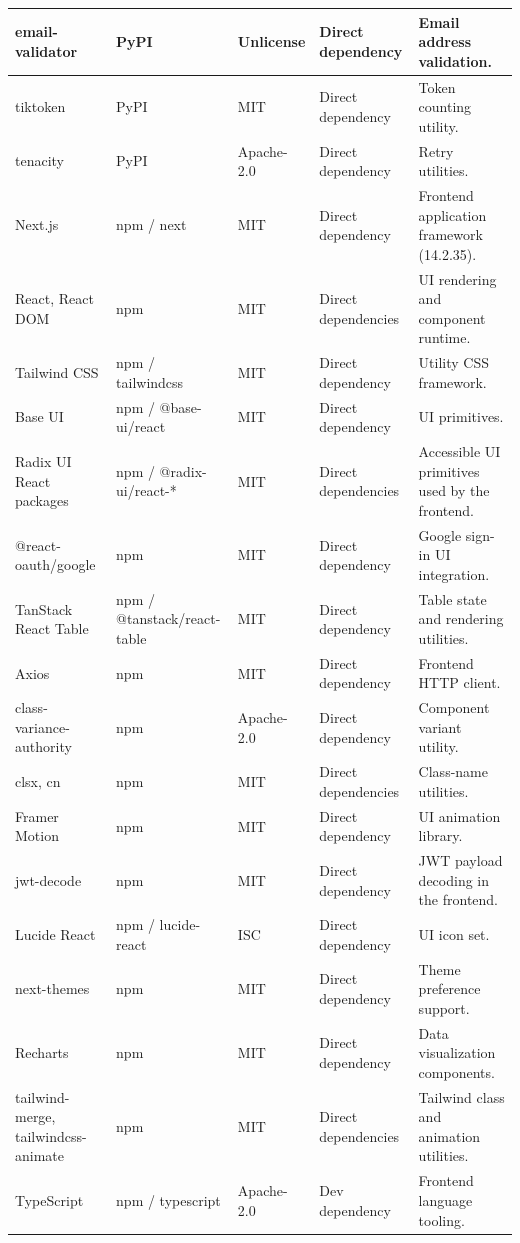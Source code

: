 \documentclass[11pt,a4paper]{article}
\begin{document}
{\begin{longtable}{@{}p{3.1cm}p{3.5cm}p{2.1cm}p{1.5cm}p{5.1cm}@{}}
\midrule
email-validator & PyPI & Unlicense & Direct dependency & Email address validation. \\
\midrule
tiktoken & PyPI & MIT & Direct dependency & Token counting utility. \\
\midrule
tenacity & PyPI & Apache-2.0 & Direct dependency & Retry utilities. \\
\midrule
Next.js & npm / next & MIT & Direct dependency & Frontend application framework (14.2.35). \\
\midrule
React, React DOM & npm & MIT & Direct dependencies & UI rendering and component runtime. \\
\midrule
Tailwind CSS & npm / tailwindcss & MIT & Direct dependency & Utility CSS framework. \\
\midrule
Base UI & npm / @base-ui/react & MIT & Direct dependency & UI primitives. \\
\midrule
Radix UI React packages & npm / @radix-ui/react-* & MIT & Direct dependencies & Accessible UI primitives used by the frontend. \\
\midrule
@react-oauth/google & npm & MIT & Direct dependency & Google sign-in UI integration. \\
\midrule
TanStack React Table & npm / @tanstack/react-table & MIT & Direct dependency & Table state and rendering utilities. \\
\midrule
Axios & npm & MIT & Direct dependency & Frontend HTTP client. \\
\midrule
class-variance-authority & npm & Apache-2.0 & Direct dependency & Component variant utility. \\
\midrule
clsx, cn & npm & MIT & Direct dependencies & Class-name utilities. \\
\midrule
Framer Motion & npm & MIT & Direct dependency & UI animation library. \\
\midrule
jwt-decode & npm & MIT & Direct dependency & JWT payload decoding in the frontend. \\
\midrule
Lucide React & npm / lucide-react & ISC & Direct dependency & UI icon set. \\
\midrule
next-themes & npm & MIT & Direct dependency & Theme preference support. \\
\midrule
Recharts & npm & MIT & Direct dependency & Data visualization components. \\
\midrule
tailwind-merge, tailwindcss-animate & npm & MIT & Direct dependencies & Tailwind class and animation utilities. \\
\midrule
TypeScript & npm / typescript & Apache-2.0 & Dev dependency & Frontend language tooling. \\

\end{longtable}}
\end{document}
